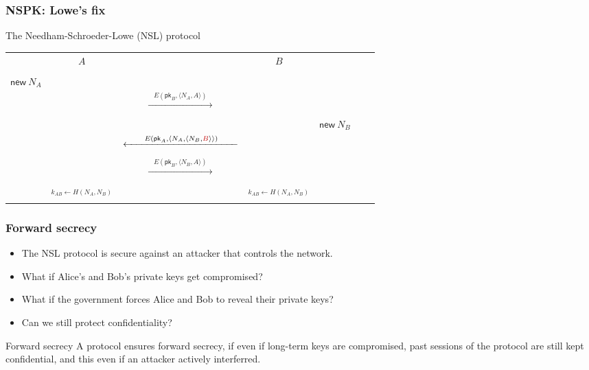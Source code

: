\documentclass[aspectratio=169, lualatex,  10pt,dvipsnames,svgnames]{beamer} %
\def\enrouge#1{\textcolor{rouge}{#1}}
\newcommand{\Aenc}{E}
\newcommand{\Pair}[2]{\langle{#1},{#2}\rangle}
\newcommand{\Pk}[1]{\mathsf{pk}_{#1}}
\newcommand{\h}{H}
\begin{document}
\begin{frame}
  \frametitle{NSPK: Lowe's fix}

  \begin{block}{The Needham-Schroeder-Lowe (NSL) protocol}
    \begin{center}
      \begin{tabular}[t]{ccccccc}
        & $A$ & & $B$ \\
        & \vline & & \vline \\
        \footnotesize{$\mathsf{new}\ N_A$} & \vline & & \vline \\
        & \vline & $\xrightarrow[\hspace{4cm}]{\Aenc(\Pk{B}, \Pair{N_A}{A})}$ & \vline \\
        & \vline & & \vline & \footnotesize{$\mathsf{new}\ N_B$} \\
        & \vline & $\xleftarrow[\hspace{4cm}]{\Aenc(\Pk{A}, \Pair{N_A}{\Pair{N_B}{\enrouge{B}}})}$ & \vline \\
        & \vline & $\xrightarrow[\hspace{4cm}]{\Aenc(\Pk{B}, \Pair{N_B}{A})}$ & \vline \\
        \\
        & $^{k_{AB}\leftarrow \h(N_A, N_B)}$ & & $^{k_{AB}\leftarrow \h(N_A, N_B)}$
      \end{tabular}
    \end{center}
  \end{block}

\end{frame}

\begin{frame}
  \frametitle{Forward secrecy}

  \begin{itemize}
  \item The NSL protocol is secure against an attacker that controls the network. 
  \item What if Alice's and Bob's private keys get compromised?
  \item What if the government forces Alice and Bob to reveal their private keys?
  \item Can we still protect confidentiality? 
  \end{itemize}
  \bigskip{}

  \begin{block}{Forward secrecy}
    A protocol ensures \enrouge{forward secrecy}, if even if long-term keys are compromised, past sessions of the protocol are still kept confidential, and this even if an attacker actively interferred.   
  \end{block}
\end{frame}
\end{document}
